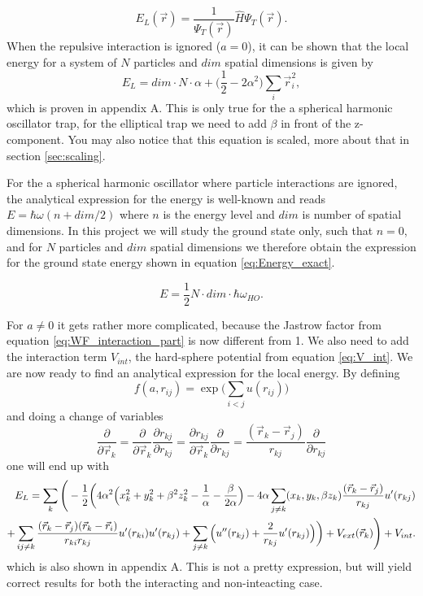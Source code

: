 \documentclass[norsk,a4paper,12pt]{article}
\begin{document}
\begin{equation}
E_L(\vec{r})=\frac{1}{\Psi_T(\vec{r})}\hat{H}\Psi_T(\vec{r}).
\label{eq:Local_energy}
\end{equation}
When the repulsive interaction is ignored ($a=0$), it can be shown that the local energy for a system of $N$ particles and $dim$ spatial dimensions is given by
\begin{equation}
E_L=dim\cdot N\cdot \alpha + \Big(\frac{1}{2}-2\alpha^2\Big)\sum_i\vec{r}_i^2,
\end{equation}
which is proven in appendix A. This is only true for the a spherical harmonic oscillator trap, for the elliptical trap we need to add $\beta$ in front of the z-component. You may also notice that this equation is scaled, more about that in section \ref{sec:scaling}.

For the a spherical harmonic oscillator where particle interactions are ignored, the analytical expression for the energy is well-known and reads $E = \hbar\omega(n + dim/2)$ where $n$ is the energy level and $dim$ is number of spatial dimensions. In this project we will study the ground state only, such that $n=0$, and for $N$ particles and $dim$ spatial dimensions we therefore obtain the expression for the ground state energy shown in equation \ref{eq:Energy_exact}.

\begin{equation}
E = \frac{1}{2}N\cdot dim\cdot\hbar\omega_{HO}.
\label{eq:Energy_exact}
\end{equation}


For $a\neq0$ it gets rather more complicated, because the Jastrow factor from equation \ref{eq:WF_interaction_part} is now different from 1. We also need to add the interaction term $V_{int}$, the hard-sphere potential from equation \ref{eq:V_int}. We are now ready to find an analytical expression for the local energy. By defining
\begin{equation}
f(a, r_{ij})=\exp{\bigg(\sum_{i<j}u(r_{ij})\bigg)}
\end{equation}
and doing a change of variables
\begin{equation}
\frac{\partial}{\partial \vec{r}_k}=\frac{\partial}{\partial \vec{r}_k}\frac{\partial r_{kj}}{\partial r_{kj}}=\frac{\partial r_{kj}}{\partial \vec{r}_k}\frac{\partial}{\partial r_{kj}}=\frac{(\vec{r}_k-\vec{r}_j)}{r_{kj}}\frac{\partial}{\partial r_{kj}}
\end{equation}
one will end up with
\begin{align}
E_L=\sum_k\Bigg(-\frac{1}{2}\bigg(4\alpha^2\Big(x_k^2+y_k^2+\beta^2z_k^2-\frac{1}{\alpha}-\frac{\beta}{2\alpha}\Big)
-4\alpha\sum_{j\neq k}(x_k, y_k, \beta z_k)\frac{(\vec{r}_k-\vec{r}_j)}{r_{kj}}u'(r_{kj})\notag\\
+\sum_{ij\neq k}\frac{(\vec{r}_k-\vec{r}_j)(\vec{r}_k-\vec{r}_i)}{r_{ki}r_{kj}}u'(r_{ki})u'(r_{kj})
+\sum_{j\neq k}\Big(u''(r_{kj})+\frac{2}{r_{kj}}u'(r_{kj})\Big)\bigg)+V_{ext}(\vec{r}_k)\Bigg) + V_{int}.\notag
\label{EL_total}
\end{align}
which is also shown in appendix A. This is not a pretty expression, but will yield correct results for both the interacting and non-inteacting case.
\end{document}
